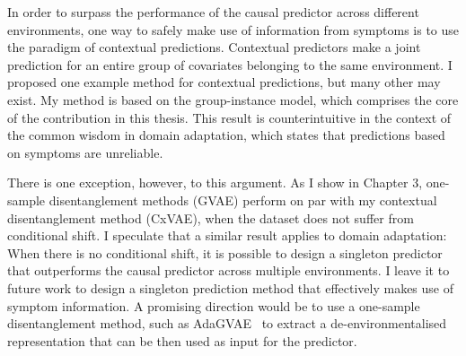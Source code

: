 \documentclass[../thesis.tex]{subfiles}
\begin{document}
In order to surpass the performance of the causal predictor across different environments, one way to safely make use of information from symptoms is to use the paradigm of contextual predictions. Contextual predictors make a joint prediction for an entire group of covariates belonging to the same environment. I proposed one example method for contextual predictions, but many other may exist. My method is based on the group-instance model, which comprises the core of the contribution in this thesis. This result is counterintuitive in the context of the common wisdom in domain adaptation, which states that predictions based on symptoms are unreliable.

There is one exception, however, to this argument. As I show in Chapter 3, one-sample disentanglement methods (GVAE) perform on par with my contextual disentanglement method (CxVAE), when the dataset does not suffer from conditional shift. I speculate that a similar result applies to domain adaptation: When there is no conditional shift, it is possible to design a singleton predictor that outperforms the causal predictor across multiple environments. I leave it to future work to design a singleton prediction method that effectively makes use of symptom information. A promising direction would be to use a one-sample disentanglement method, such as AdaGVAE~\citep{locatelloWeaklySupervisedDisentanglementCompromises2020} to extract a de-environmentalised representation that can be then used as input for the predictor.

\biblio
\end{document}
